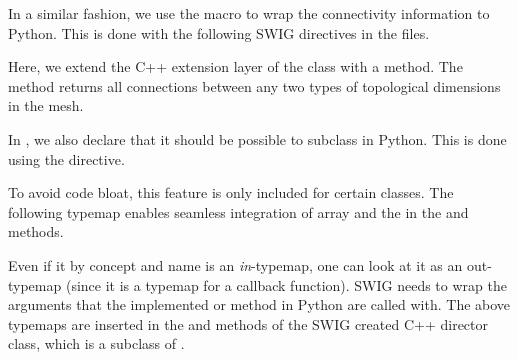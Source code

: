 In a similar fashion, we use the  macro to wrap
the connectivity information to Python. This is done with the following
SWIG directives in the  files.
Here, we extend the C++ extension layer of the
 class with a 
method. The method returns all connections between any two types of
topological dimensions in the mesh.

In , we also declare that it should be possible to
subclass  in Python. This is done using the 
directive.
\begin{swigcode}
\end{swigcode}
To avoid code bloat, this feature is only included for certain classes.
The following typemap enables seamless integration of \numpy array and
the  in the  and  methods.
Even if it by concept and name is an \textit{in}-typemap, one can look at
it as an out-typemap (since it is a typemap for a callback function). SWIG
needs to wrap the arguments that the implemented  or 
method in Python are called with. The above typemaps are inserted in the
 and  methods of the SWIG created C++ director class,
which is a subclass of .

